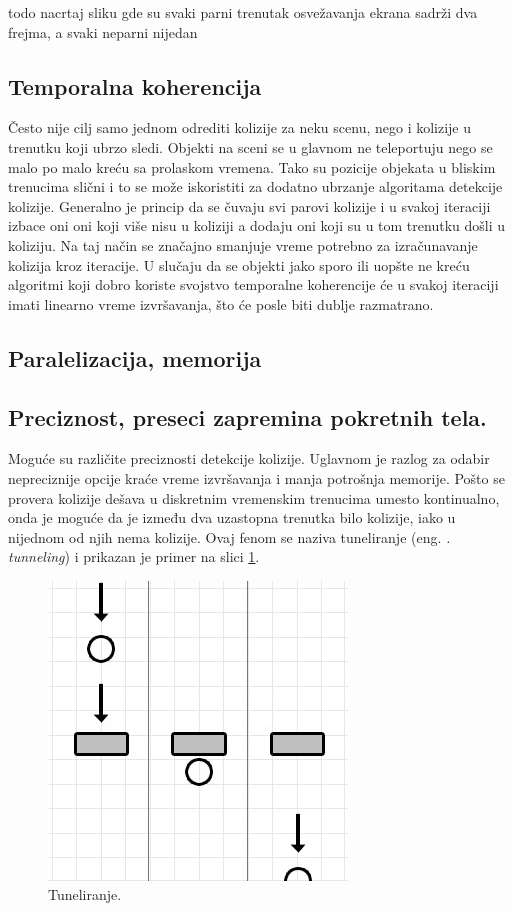 \documentclass[a4paper]{article}
\begin{document}
{todo nacrtaj sliku gde su svaki parni trenutak osvežavanja ekrana sadrži dva frejma, a svaki neparni 
nijedan


\subsection{Temporalna koherencija}

Često nije cilj samo jednom odrediti kolizije za neku scenu, nego i kolizije u trenutku koji ubrzo sledi.
Objekti na sceni se u glavnom ne teleportuju nego se malo po malo kreću sa prolaskom vremena.
Tako su pozicije objekata u bliskim trenucima slični i to se može iskoristiti za dodatno ubrzanje algoritama 
detekcije kolizije. Generalno je princip da se čuvaju svi parovi kolizije i u svakoj iteraciji 
izbace oni oni koji više nisu u koliziji a dodaju oni koji su u tom trenutku došli u koliziju.
Na taj način se značajno smanjuje vreme potrebno za izračunavanje kolizija kroz iteracije.
U slučaju da se objekti jako sporo ili uopšte ne kreću algoritmi koji dobro koriste svojstvo temporalne 
koherencije će u svakoj iteraciji imati linearno vreme izvršavanja, što će posle biti dublje razmatrano. 

\subsection{Paralelizacija, memorija}

\subsection{Preciznost, preseci zapremina pokretnih tela.}

Moguće su različite preciznosti detekcije kolizije. 
Uglavnom je razlog za odabir nepreciznije opcije kraće vreme izvršavanja i manja potrošnja memorije.
Pošto se provera kolizije dešava u diskretnim vremenskim trenucima umesto kontinualno, onda je moguće da 
je između dva uzastopna trenutka bilo kolizije, iako u nijednom od njih nema kolizije. 
Ovaj fenom se naziva tuneliranje (eng. {\em. tunneling}) i prikazan je primer na slici \ref{fig:tunnel}. 

\begin{figure}[h!]
	\begin{center}
	\includegraphics[scale=0.45]{tunnel.png}
	\end{center}
	\caption{Tuneliranje.}
	\label{fig:tunnel}
\end{figure}

}
\end{document}
